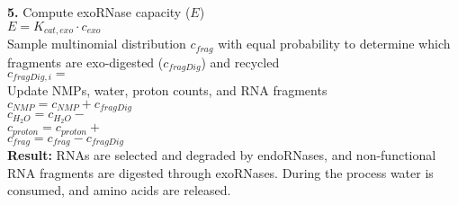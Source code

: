 \documentclass[12pt]{article}
\begin{document}
\begin{algorithm}[H]
\textbf{5.} Compute exoRNase capacity ($E$)\\
    \-\hspace{1cm} $E = K_{cat,exo} \cdot c_{exo}$\\
    {
      Sample multinomial distribution $c_{frag}$ with equal probability to determine which fragments are exo-digested ($c_{fragDig}$) and recycled\\
        \-\hspace{1cm} $c_{fragDig,i} =$ \\
        Update NMPs, water, proton counts, and RNA fragments\\
      \-\hspace{1cm} $c_{NMP} = c_{NMP} + c_{fragDig}$\\
        \-\hspace{1cm} $c_{H_2O} = c_{H_2O} - $ \\
        \-\hspace{1cm} $c_{proton} = c_{proton} + $ \\
        \-\hspace{1cm} $c_{frag} = c_{frag} - c_{fragDig}$\\
    }
    \textbf{Result:} RNAs are selected and degraded by endoRNases, and non-functional RNA fragments are digested through exoRNases. During the process water is consumed, and amino acids are released. 
 
\end{algorithm}

\newpage

\label{sec:references}


\end{document}
